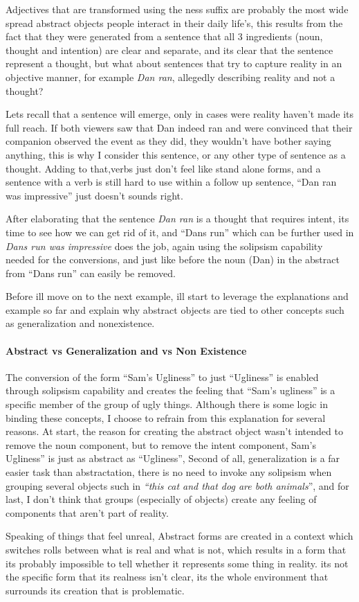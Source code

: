 \documentclass[10pt]{article}
\begin{document}
Adjectives that are transformed using the ness suffix are probably the most wide spread abstract objects people interact in their daily life's, this results from the fact that they were generated from a sentence that all 3 ingredients (noun, thought and intention) are clear and separate, and its clear that the sentence represent a thought, but what about sentences that try to capture reality in an objective manner, for example \textit{Dan ran}, allegedly describing reality and not a thought? \par
Lets recall that a sentence will emerge, only in cases were reality haven't made its full reach. If both viewers saw that Dan indeed ran  and were convinced that their companion observed the event as they did, they wouldn't have bother saying anything, this is why I consider this sentence, or any other type of sentence as a thought. Adding to that,verbs just don’t feel like  stand alone forms, and a sentence with a verb is still hard to use within a follow up sentence,  “Dan ran was impressive” just doesn't sounds right.\par

After elaborating that the sentence \textit{Dan ran} is a thought that requires intent, its time to see how we can get rid of it, and “Dans run” which can be further used in  \textit{Dans run was impressive} does the job, again using the solipsism capability needed for the conversions, and just like before the noun (Dan)  in the abstract from “Dans run” can easily be removed.\par
Before ill move on to the next example, ill start to leverage the explanations and example so far and explain why abstract objects are tied to other concepts such as  generalization and nonexistence.\par

\paragraph{Abstract vs Generalization and vs Non Existence}
The conversion of the form “Sam’s Ugliness” to just “Ugliness” is enabled through  solipsism capability and creates the feeling that “Sam’s ugliness” is a specific member of the group of ugly things. Although there is some logic in binding these concepts, I choose to refrain from this explanation for several reasons. At start, the reason for creating the abstract object wasn't intended to remove the noun component, but to remove the intent component, Sam's Ugliness” is just as abstract as “Ugliness”, Second of all, generalization is a far easier task than abstractation, there is no need to invoke any solipsism when grouping several objects such in  \textit{“this cat and that dog are both animals}”, and for last, I don’t think that  groups (especially of objects) create any feeling of components that aren't part of reality.\par
Speaking of things that feel unreal, Abstract forms are created in a context which switches rolls between what is real and what is not, which results in a form that its probably impossible to tell whether it represents some thing in reality.  its not the specific form that its realness isn’t clear, its the whole environment that surrounds its creation that is problematic. 
\end{document}
